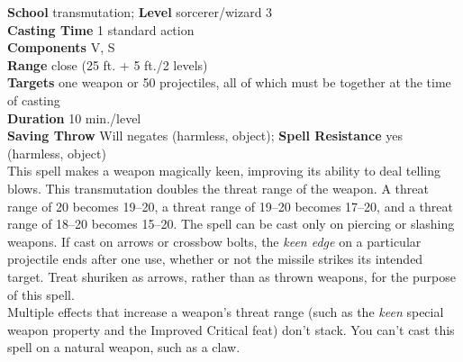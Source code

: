 \textbf{School} transmutation; \textbf{Level} sorcerer/wizard 3\\
\textbf{Casting Time} 1 standard action\\
\textbf{Components} V, S\\
\textbf{Range} close (25 ft. + 5 ft./2 levels)\\
\textbf{Targets} one weapon or 50 projectiles, all of which must be together at the time of casting\\
\textbf{Duration} 10 min./level \\
\textbf{Saving Throw }Will negates (harmless, object); \textbf{Spell Resistance} yes (harmless, object)\\
This spell makes a weapon magically keen, improving its ability to deal telling blows. This transmutation doubles the threat range of the weapon. A threat range of 20 becomes 19–20, a threat range of 19–20 becomes 17–20, and a threat range of 18–20 becomes 15–20. The spell can be cast only on piercing or slashing weapons. If cast on arrows or crossbow bolts, the \textit{keen edge }on a particular projectile ends after one use, whether or not the missile strikes its intended target. Treat shuriken as arrows, rather than as thrown weapons, for the purpose of this spell.\\
Multiple effects that increase a weapon's threat range (such as the \textit{keen }special weapon property and the Improved Critical feat) don't stack. You can't cast this spell on a natural weapon, such as a claw.\\
